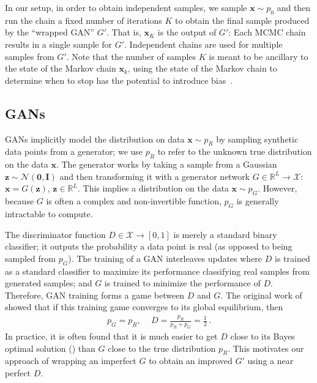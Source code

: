\documentclass{article}
\renewcommand{\vec}[1]{{\boldsymbol{\mathbf{#1}}}} %
\newcommand{\mat}[1]{{\ensuremath{\mathbf{#1}}}} %
\newcommand{\R}{\mathbb{R}}
\newcommand{\set}[1]{\mathcal{#1}}
\newcommand{\sample}{\sim}
\newcommand{\norm}{\mathcal{N}}
\newcommand{\pinit}{{p_0}}
\newcommand{\PG}{{p_G}}
\newcommand{\PR}{{p_R}}
\newcommand{\setx}{\set{X}}
\begin{document}
In our setup, in order to obtain independent samples, we sample $\vec x \sample \pinit$ and then run the chain a fixed number of iterations $K$ to obtain the final sample produced by the ``wrapped GAN'' $G'$.
That is, $\vec x_K$ is the output of $G'$: Each MCMC chain results in a single sample for $G'$.
Independent chains are used for multiple samples from $G'$.
Note that the number of samples $K$ is meant to be ancillary to the state of the Markov chain $\vec x_k$, using the state of the Markov chain to determine when to stop has the potential to introduce bias~\citep{Cowles1999}.

\subsection{GANs}

GANs implicitly model the distribution on data $\vec x \sample \PR$ by sampling synthetic data points from a generator; we use $\PR$ to refer to the unknown true distribution on the data $\vec x$.
The generator works by taking a sample from a Gaussian $\vec z \sample \norm(\vec 0,\mat I)$ and then transforming it with a generator network $G \in \R^L \rightarrow \setx$: $\vec x = G(\vec z)$, $\vec z \in \R^L$.
This implies a distribution on the data $\vec x \sample \PG$.
However, because $G$ is often a complex and non-invertible function, $\PG$ is generally intractable to compute.

The discriminator function $D \in \setx \rightarrow [0,1]$ is merely a standard binary classifier; it outputs the probability a data point is real (as opposed to being sampled from $\PG$)\@.
The training of a GAN interleaves updates where $D$ is trained as a standard classifier to maximize its performance classifying real samples from generated samples; and $G$ is trained to minimize the performance of $D$.
Therefore, GAN training forms a game between $D$ and $G$.
The original work of~\citet{Goodfellow2014} showed that if this training game converges to its global equilibrium, then
\begin{align}
  \PG = \PR,\, \quad D = \frac{\PR}{\PR + \PG} = \frac{1}{2}\,.
\end{align}
In practice, it is often found that it is much easier to get $D$ close to its Bayes optimal solution (\smash{$\PR/(\PR + \PG)$}) than $G$ close to the true distribution $\PR$.
This motivates our approach of wrapping an imperfect $G$ to obtain an improved $G'$ using a near perfect $D$.
\end{document}

